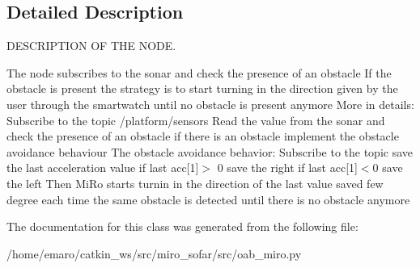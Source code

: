 \subsection{Detailed Description}
D\+E\+S\+C\+R\+I\+P\+T\+I\+ON OF T\+HE N\+O\+DE. 

The node subscribes to the sonar and check the presence of an obstacle If the obstacle is present the strategy is to start turning in the direction given by the user through the smartwatch until no obstacle is present anymore More in details\+: Subscribe to the topic /platform/sensors Read the value from the sonar and check the presence of an obstacle if there is an obstacle implement the obstacle avoidance behaviour The obstacle avoidance behavior\+: Subscribe to the topic  save the last acceleration value if last acc\mbox{[}1\mbox{]}$>$ 0 save the right if last acc\mbox{[}1\mbox{]}$<$0 save the left Then Mi\+Ro starts turnin in the direction of the last value saved few degree each time the same obstacle is detected until there is no obstacle anymore 

The documentation for this class was generated from the following file\+:\begin{DoxyCompactItemize}
\item 
/home/emaro/catkin\+\_\+ws/src/miro\+\_\+sofar/src/oab\+\_\+miro.\+py\end{DoxyCompactItemize}
